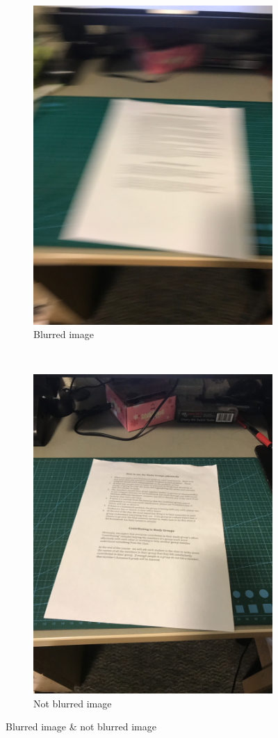 \begin{figure}
  \centering
    \begin{subfigure}[t]{0.5\textwidth}
        \centering
        \includegraphics[width=0.6\linewidth]{blur.jpg}
        \caption{Blurred image}
    \end{subfigure}%
    ~ 
    \begin{subfigure}[t]{0.5\textwidth}
        \centering
        \includegraphics[width=0.6\linewidth]{notblur.JPG}
        \caption{Not blurred image}
    \end{subfigure}
    
    \caption{Blurred image \& not blurred image}
	\label{blurrinessTest}
\end{figure}

